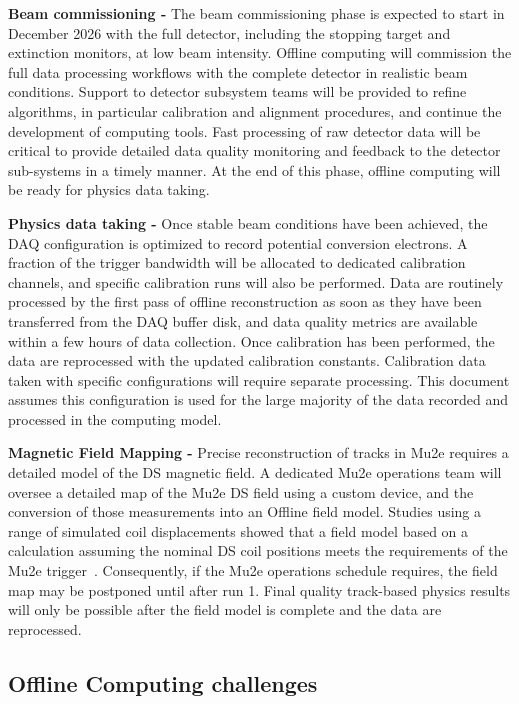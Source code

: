 {\bf Beam commissioning - } The beam commissioning phase is expected to start in December 2026 with the full detector, including the stopping target and extinction monitors, at low beam intensity. Offline computing will commission the full data processing workflows with the complete detector in realistic beam conditions. Support to detector subsystem teams will be provided to refine algorithms, in particular calibration and alignment procedures, and continue the development of computing tools. Fast processing of raw detector data will be critical to provide detailed data quality monitoring and feedback to the detector sub-systems in a timely manner. At the end of this phase, offline computing will be ready for physics data taking.

{\bf Physics data taking - } Once stable beam conditions have been achieved, the DAQ configuration is optimized to record potential conversion electrons. A fraction of the trigger bandwidth will be allocated to dedicated calibration channels, and specific calibration runs will also be performed. Data are routinely processed by the first pass of offline reconstruction as soon as they have been transferred from the DAQ buffer disk, and data quality metrics are available within a few hours of data collection. Once calibration has been performed, the data are reprocessed with the updated calibration constants. Calibration data taken with specific configurations will require separate processing. This document assumes this configuration is used for the large majority of the data recorded and processed in the computing model.

{\bf Magnetic Field Mapping - } Precise reconstruction of tracks in Mu2e requires a detailed model of the DS magnetic field. A dedicated Mu2e operations team will oversee a detailed map of the Mu2e DS field using a custom device, and the conversion of those measurements into an Offline field model. Studies using a range of simulated coil displacements showed that a field model based on a calculation assuming the nominal DS coil positions meets the requirements of the Mu2e trigger~\cite{docdb46856}. Consequently, if the Mu2e operations schedule requires, the field map may be postponed until after run 1. Final quality track-based physics results will only be possible after the field model is complete and the data are reprocessed.


\subsection{Offline Computing challenges}

